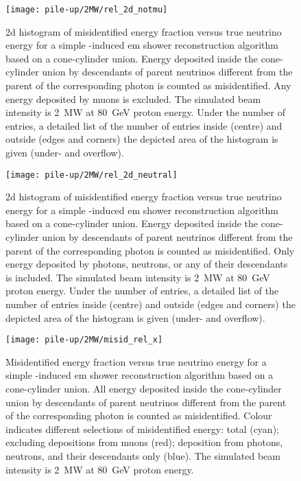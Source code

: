 \begin{figure}[htb]
	\centering
	\texttt{[image: pile-up/2MW/rel\_2d\_notmu]}
	\caption{\gls{2d} histogram of misidentified energy fraction versus true neutrino energy for a simple \Pgpz-induced \gls{em} shower reconstruction algorithm based on a cone-cylinder union.
		Energy deposited inside the cone-cylinder union by descendants of parent neutrinos different from the parent of the corresponding \Pgpz photon is counted as misidentified.
		Any energy deposited by muons is excluded.
		The simulated beam intensity is \SI{2}{\mega\watt} at \SI{80}{\giga\electronvolt} proton energy.
		Under the number of entries, a detailed list of the number of entries inside (centre) and outside (edges and corners) the depicted area of the histogram is given (under- and overflow).}
\end{figure}

\begin{figure}[htb]
	\centering
	\texttt{[image: pile-up/2MW/rel\_2d\_neutral]}
	\caption{\gls{2d} histogram of misidentified energy fraction versus true neutrino energy for a simple \Pgpz-induced \gls{em} shower reconstruction algorithm based on a cone-cylinder union.
		Energy deposited inside the cone-cylinder union by descendants of parent neutrinos different from the parent of the corresponding \Pgpz photon is counted as misidentified.
		Only energy deposited by photons, neutrons, or any of their descendants is included.
		The simulated beam intensity is \SI{2}{\mega\watt} at \SI{80}{\giga\electronvolt} proton energy.
		Under the number of entries, a detailed list of the number of entries inside (centre) and outside (edges and corners) the depicted area of the histogram is given (under- and overflow).}
\end{figure}

\begin{figure}[htb]
	\centering
	\texttt{[image: pile-up/2MW/misid\_rel\_x]}
	\caption{Misidentified energy fraction versus true neutrino energy for a simple \Pgpz-induced \gls{em} shower reconstruction algorithm based on a cone-cylinder union.
		All energy deposited inside the cone-cylinder union by descendants of parent neutrinos different from the parent of the corresponding \Pgpz photon is counted as misidentified.
		Colour indicates different selections of misidentified energy: total (cyan); excluding depositions from muons (red); deposition from photons, neutrons, and their descendants only (blue).
		The simulated beam intensity is \SI{2}{\mega\watt} at \SI{80}{\giga\electronvolt} proton energy.}
\end{figure}

